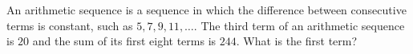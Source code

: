 An arithmetic sequence is a sequence in which the difference between consecutive terms is constant, such as $5,7,9,11,\dots$. The third term of an arithmetic sequence is $20$ and the sum of its first eight terms is $244$. What is the first term?
